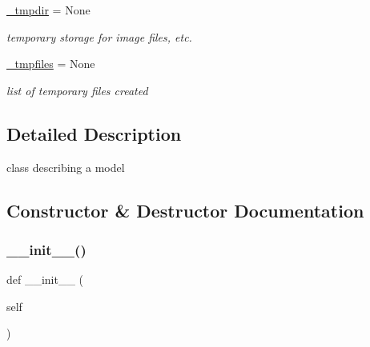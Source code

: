 \begin{DoxyCompactItemize}
\hyperlink{class_mu_mo_t_1_1_mu_mo_tmodel_ad2feb50403a36ab7c591c04e0cf33cc4}{\+\_\+tmpdir} = None
\begin{DoxyCompactList}\small\item\em temporary storage for image files, etc. \end{DoxyCompactList}\item 
\hyperlink{class_mu_mo_t_1_1_mu_mo_tmodel_a3f2d20ce626e9e6cdc4a4662727121e6}{\+\_\+tmpfiles} = None
\begin{DoxyCompactList}\small\item\em list of temporary files created \end{DoxyCompactList}\end{DoxyCompactItemize}


\subsection{Detailed Description}
class describing a model 

\subsection{Constructor \& Destructor Documentation}
\mbox{\label{class_mu_mo_t_1_1_mu_mo_tmodel_ae64f0875afe3067b97ba370b354b9213}} 
\subsubsection{\texorpdfstring{\+\_\+\+\_\+init\+\_\+\+\_\+()}{\_\_init\_\_()}}
{\footnotesize\ttfamily def \+\_\+\+\_\+init\+\_\+\+\_\+ (\begin{DoxyParamCaption}\item[{}]{self }\end{DoxyParamCaption})}

\mbox{\label{class_mu_mo_t_1_1_mu_mo_tmodel_a41a65d7030dd1006b177d0bc24e1a12b}} 
